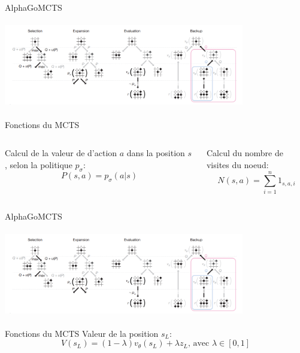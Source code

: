 \begin{frame}{AlphaGo}{MCTS}
    \begin{center}
        \includegraphics[width=10.5cm, height=3.8cm]{ressources/AlphaGo/MCTS_AlphaGo}
        \begin{block}{ Fonctions du MCTS }
            \begin{columns}[t]
                \begin{column}{0.45\textwidth}
                    Calcul de la valeur de d'action $a$ dans la position $s$, selon la politique $p_\sigma$:
                    $$P(s,a) = p_\sigma(a|s)$$

                \end{column}
                \begin{column}{0.45\textwidth}
                    Calcul du nombre de visites du noeud:
                    $$N (s,a) = \sum\limits_{i=1}^{n} 1_{s,a,i} $$
                \end{column}

            \end{columns}
        \end{block}

    \end{center}
\end{frame}

\begin{frame}{AlphaGo}{MCTS}
    \begin{center}
        \includegraphics[width=10.5cm, height=3.8cm]{ressources/AlphaGo/MCTS_AlphaGo}
        \begin{block}{ Fonctions du MCTS }
            Valeur de la position $s_L$:
            $$V(s_L)=(1-\lambda)v_\theta(s_L) + \lambda z_L \mbox{, avec } \lambda \in [0,1]$$
        \end{block}
    \end{center}
\end{frame}

